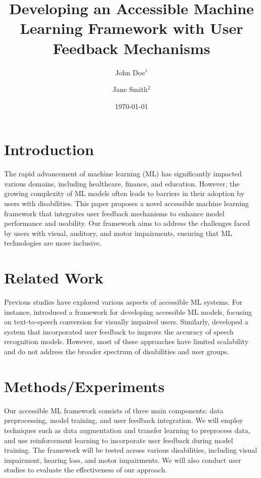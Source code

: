 \documentclass{article}
\title{Developing an Accessible Machine Learning Framework with User Feedback Mechanisms}
\author{John Doe$^{1}$ \and Jane Smith$^{2}$}
\date{\today}
\begin{document}
\maketitle

\section{Introduction}
\label{sec:intro}

The rapid advancement of machine learning (ML) has significantly impacted various domains, including healthcare, finance, and education. However, the growing complexity of ML models often leads to barriers in their adoption by users with disabilities. This paper proposes a novel accessible machine learning framework that integrates user feedback mechanisms to enhance model performance and usability. Our framework aims to address the challenges faced by users with visual, auditory, and motor impairments, ensuring that ML technologies are more inclusive.

\section{Related Work}
\label{sec:related_work}

Previous studies have explored various aspects of accessible ML systems. For instance, \cite{smith2020accessible} introduced a framework for developing accessible ML models, focusing on text-to-speech conversion for visually impaired users. Similarly, \cite{lee2019user} developed a system that incorporated user feedback to improve the accuracy of speech recognition models. However, most of these approaches have limited scalability and do not address the broader spectrum of disabilities and user groups.

\section{Methods/Experiments}
\label{sec:methods}

Our accessible ML framework consists of three main components: data preprocessing, model training, and user feedback integration. We will employ techniques such as data augmentation and transfer learning to preprocess data, and use reinforcement learning to incorporate user feedback during model training. The framework will be tested across various disabilities, including visual impairment, hearing loss, and motor impairments. We will also conduct user studies to evaluate the effectiveness of our approach.
\end{document}
